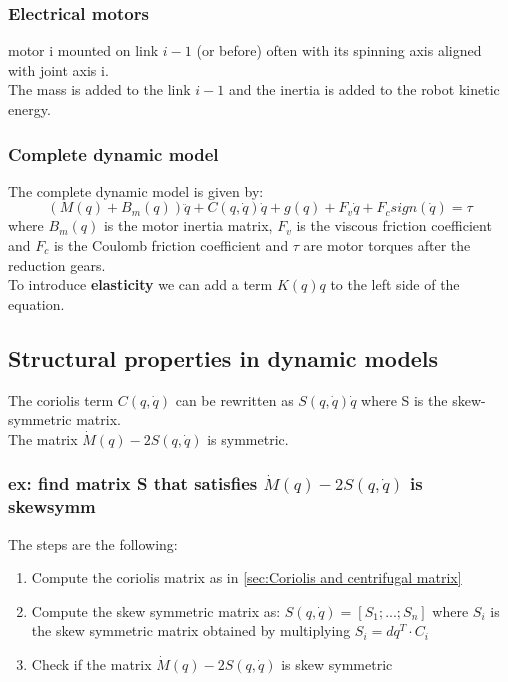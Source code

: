 \documentclass[a4paper,12pt]{article}
\begin{document}
\subsubsection{Electrical motors}
motor i mounted on link $i-1$ (or before) often with 
its spinning axis aligned with joint axis i.\\
The mass is added to the link $i-1$ and the inertia is
added to the robot kinetic energy.
\subsubsection{Complete dynamic model}
The complete dynamic model is given by:
\begin{equation}
    (M(q)+B_m(q))\ddot{q} + C(q,\dot{q})\dot{q} + g(q) + F_v\dot{q} + F_c sign(\dot{q}) = \tau
\end{equation}
where $B_m(q)$ is the motor inertia matrix, $F_v$ is the 
viscous friction coefficient and $F_c$ is the Coulomb friction 
coefficient and $\tau$ are motor torques after the reduction gears.\\
To introduce \textbf{elasticity} we can add a term $K(q)q$ to the
left side of the equation.
\subsection{Structural properties in dynamic models}
The coriolis term $C(q,\dot{q})$ can be  rewritten as $S(q,\dot{q})\dot{q}$ where 
S is the skew-symmetric matrix.\\
The matrix $\dot{M}(q)-2S(q,\dot{q})$ is symmetric.
\subsubsection{ex: find matrix S that satisfies $\dot{M}(q)-2S(q,\dot{q})$ is skewsymm}
The steps are the following:
\begin{enumerate}
    \item Compute the coriolis matrix as in \ref{sec:Coriolis and centrifugal matrix}
    \item Compute the skew symmetric matrix as: $S(q,\dot{q}) = [S_1;...;S_n]$ where $S_i$ is 
    the skew symmetric matrix obtained by multiplying $S_i = dq^T \cdot C_i$
    \item Check if the matrix $\dot{M}(q)-2S(q,\dot{q})$ is skew symmetric
\end{enumerate}
\end{document}
